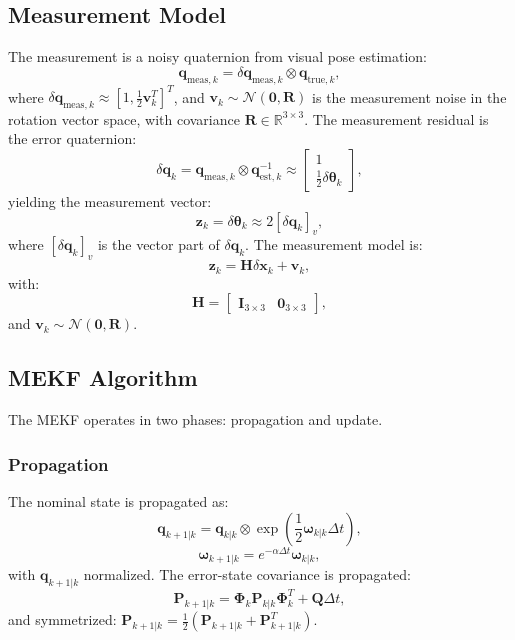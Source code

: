 \documentclass[11pt]{article}
\begin{document}
\subsection{Measurement Model}
The measurement is a noisy quaternion from visual pose estimation:
\[
\mathbf{q}_{\text{meas},k} = \delta \mathbf{q}_{\text{meas},k} \otimes \mathbf{q}_{\text{true},k},
\]
where \(\delta \mathbf{q}_{\text{meas},k} \approx [1, \frac{1}{2} \mathbf{v}_k^T]^T\), and \(\mathbf{v}_k \sim \mathcal{N}(\mathbf{0}, \mathbf{R})\) is the measurement noise in the rotation vector space, with covariance \(\mathbf{R} \in \mathbb{R}^{3 \times 3}\). The measurement residual is the error quaternion:
\[
\delta \mathbf{q}_k = \mathbf{q}_{\text{meas},k} \otimes \mathbf{q}_{\text{est},k}^{-1} \approx \begin{bmatrix} 1 \\ \frac{1}{2} \delta \boldsymbol{\theta}_k \end{bmatrix},
\]
yielding the measurement vector:
\[
\mathbf{z}_k = \delta \boldsymbol{\theta}_k \approx 2 [\delta \mathbf{q}_k]_v,
\]
where \([\delta \mathbf{q}_k]_v\) is the vector part of \(\delta \mathbf{q}_k\). The measurement model is:
\[
\mathbf{z}_k = \mathbf{H} \delta \mathbf{x}_k + \mathbf{v}_k,
\]
with:
\[
\mathbf{H} = \begin{bmatrix} \mathbf{I}_{3 \times 3} & \mathbf{0}_{3 \times 3} \end{bmatrix},
\]
and \(\mathbf{v}_k \sim \mathcal{N}(\mathbf{0}, \mathbf{R})\).

\subsection{MEKF Algorithm}
The MEKF operates in two phases: propagation and update.

\subsubsection{Propagation}
The nominal state is propagated as:
\[
\mathbf{q}_{k+1|k} = \mathbf{q}_{k|k} \otimes \exp\left(\frac{1}{2} \boldsymbol{\omega}_{k|k} \Delta t\right),
\]
\[
\boldsymbol{\omega}_{k+1|k} = e^{-\alpha \Delta t} \boldsymbol{\omega}_{k|k},
\]
with \(\mathbf{q}_{k+1|k}\) normalized. The error-state covariance is propagated:
\[
\mathbf{P}_{k+1|k} = \boldsymbol{\Phi}_k \mathbf{P}_{k|k} \boldsymbol{\Phi}_k^T + \mathbf{Q} \Delta t,
\]
and symmetrized: \(\mathbf{P}_{k+1|k} = \frac{1}{2} (\mathbf{P}_{k+1|k} + \mathbf{P}_{k+1|k}^T)\).
\end{document}
